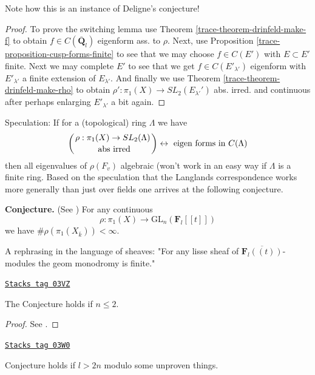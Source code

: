 Note how this is an instance of Deligne's conjecture!

\begin{proof}

To prove the switching lemma use
Theorem \ref{trace-theorem-drinfeld-make-f}
to obtain $f\in C(\overline{\mathbf{Q}}_l)$ eigenform ass. to $\rho$.
Next, use
Proposition \ref{trace-proposition-cusp-forms-finite}
to see that we may choose $f\in C(E')$ with $E \subset E'$ finite.
Next we may complete $E'$ to see that we get
$f\in C(E'_{\lambda'})$ eigenform with
$E'_{\lambda'}$ a finite extension of $E_{\lambda'}$.
And finally we use
Theorem \ref{trace-theorem-drinfeld-make-rho}
to obtain
$\rho': \pi_1(X) \to SL_2(E_{\lambda'}')$ abs. irred. and continuous
after perhaps enlarging $E'_{\lambda'}$ a bit again.
\end{proof}

Speculation: If for a (topological) ring $\Lambda$ we have
$$
\left(
{\rho : \pi_1(X)\to SL_2(\Lambda) \atop \text{ abs irred}}
\right)
\leftrightarrow
\text{ eigen forms in } C(\Lambda)
$$
then all eigenvalues of $\rho(F_v)$ algebraic (won't work in an easy
way if $\Lambda$ is a finite ring. Based on the speculation that the
Langlands correspondence works more generally than just over fields
one arrives at the following conjecture.

\medskip\noindent
{\bf Conjecture.}
(See \cite{dJ-conjecture})
For any continuous
$$
\rho : \pi_1(X)\to \text{GL}_n(\mathbf{F}_l[[t]])
$$
we have $\# \rho(\pi_1(X_{\overline{k}}))<\infty$.

\medskip\noindent
A rephrasing in the language of sheaves:
"For any lisse sheaf of $\overline{\mathbf{F}_l((t))}$-modules the geom
monodromy is finite."

\begin{theorem}[Conjecture n 2]
\label{trace-theorem-conjecture-n-2}
\href{https://stacks.math.columbia.edu/tag/03VZ}{\texttt{Stacks tag 03VZ}}

The Conjecture holds if $n\leq 2$.
\end{theorem}

\begin{proof}
See \cite{dJ-conjecture}.
\end{proof}

\begin{theorem}
\label{trace-theorem-conjecture-l-bigger-2n}
\href{https://stacks.math.columbia.edu/tag/03W0}{\texttt{Stacks tag 03W0}}

Conjecture holds if $l > 2n$ modulo some unproven things.
\end{theorem}

